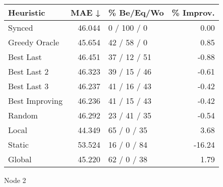 \begin{tabular}{lrlr}
\toprule
\textbf{Heuristic} & \textbf{MAE ↓} & \textbf{\% Be/Eq/Wo} & \textbf{\% Improv.} \\
\midrule
            Synced &         46.044 &          0 / 100 / 0 &                0.00 \\
     Greedy Oracle &         45.654 &          42 / 58 / 0 &                0.85 \\
         Best Last &         46.451 &         37 / 12 / 51 &               -0.88 \\
       Best Last 2 &         46.323 &         39 / 15 / 46 &               -0.61 \\
       Best Last 3 &         46.237 &         41 / 16 / 43 &               -0.42 \\
    Best Improving &         46.236 &         41 / 15 / 43 &               -0.42 \\
            Random &         46.292 &         23 / 41 / 35 &               -0.54 \\
             Local &         44.349 &          65 / 0 / 35 &                3.68 \\
            Static &         53.524 &          16 / 0 / 84 &              -16.24 \\
            Global &         45.220 &          62 / 0 / 38 &                1.79 \\
\bottomrule
\end{tabular}
\caption{Node 2}
\label{tab:non_lr05_le1_bs4_2}
